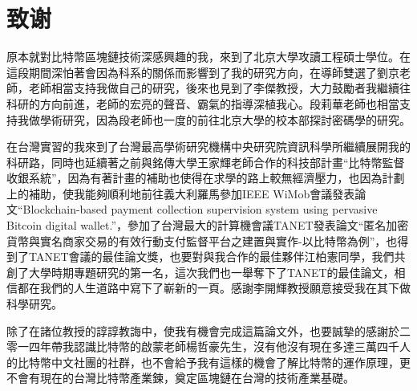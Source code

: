 
\chapter{致谢}
原本就對比特幣區塊鏈技術深感興趣的我，來到了北京大學攻讀工程碩士學位。在這段期間深怕著會因為科系的關係而影響到了我的研究方向，在導師雙選了劉京老師，老師相當支持我做自己的研究，後來也見到了李傑教授，大力鼓勵者我繼續往科研的方向前進，老師的宏亮的聲音、霸氣的指導深植我心。段莉華老師也相當支持我做學術研究，因為段老師也一度的前往北京大學的校本部探討密碼學的研究。

在台灣實習的我來到了台灣最高學術研究機構中央研究院資訊科學所繼續展開我的科研路，同時也延續著之前與銘傳大學王家輝老師合作的科技部計畫“比特幣監督收銀系統”，因為有著計畫的補助也使得在求學的路上較無經濟壓力，也因為計劃上的補助，使我能夠順利地前往義大利羅馬參加IEEE WiMob會議發表論文“Blockchain-based payment collection supervision system using pervasive Bitcoin digital wallet.”，參加了台灣最大的計算機會議TANET發表論文“匿名加密貨幣與實名商家交易的有效行動支付監督平台之建置與實作-以比特幣為例”，也得到了TANET會議的最佳論文獎，也要對與我合作的最佳夥伴江柏憲同學，我們共創了大學時期專題研究的第一名，這次我們也一舉奪下了TANET的最佳論文，相信都在我們的人生道路中寫下了嶄新的一頁。感謝李開輝教授願意接受我在其下做科學研究。

除了在諸位教授的諄諄教誨中，使我有機會完成這篇論文外，也要誠摯的感謝於二零一四年帶我認識比特幣的啟蒙老師楊哲豪先生，沒有他沒有現在多達三萬四千人的比特幣中文社團的社群，也不會給予我有這樣的機會了解比特幣的運作原理，更不會有現在的台灣比特幣產業鍊，奠定區塊鏈在台灣的技術產業基礎。

